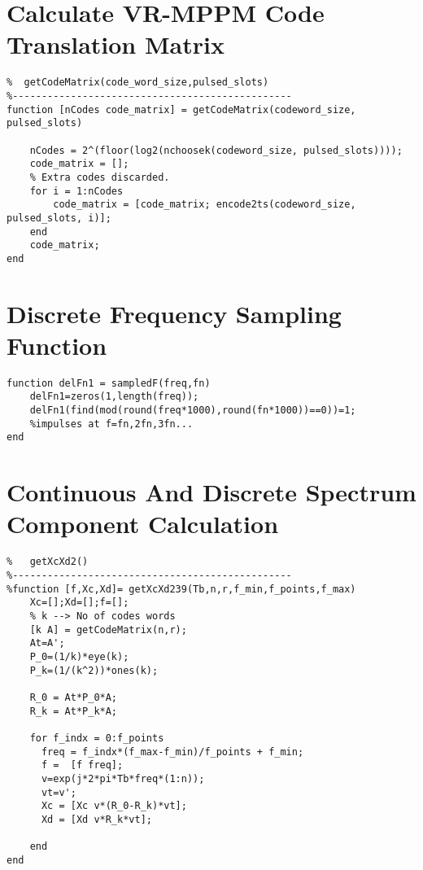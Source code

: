 \newpage
\section{Calculate VR-MPPM Code Translation Matrix}
\begin{lstlisting}[style=Matlab-editor,basicstyle=\footnotesize]
%------------------------------------------------
%  getCodeMatrix(code_word_size,pulsed_slots)
%------------------------------------------------
function [nCodes code_matrix] = getCodeMatrix(codeword_size, pulsed_slots)

    nCodes = 2^(floor(log2(nchoosek(codeword_size, pulsed_slots))));
    code_matrix = [];
    % Extra codes discarded.
    for i = 1:nCodes
        code_matrix = [code_matrix; encode2ts(codeword_size, pulsed_slots, i)];
    end
    code_matrix;
end
\end{lstlisting}

\newpage
\section{Discrete Frequency Sampling Function}
\begin{lstlisting}[style=Matlab-editor,basicstyle=\footnotesize]
function delFn1 = sampledF(freq,fn)
    delFn1=zeros(1,length(freq));
    delFn1(find(mod(round(freq*1000),round(fn*1000))==0))=1;
    %impulses at f=fn,2fn,3fn... 
end
\end{lstlisting}

\newpage
\section{Continuous And Discrete Spectrum Component Calculation}
\begin{lstlisting}[style=Matlab-editor,basicstyle=\footnotesize]
%------------------------------------------------
%   getXcXd2()
%------------------------------------------------
%function [f,Xc,Xd]= getXcXd239(Tb,n,r,f_min,f_points,f_max)
    Xc=[];Xd=[];f=[];    
    % k --> No of codes words
    [k A] = getCodeMatrix(n,r);
    At=A';
    P_0=(1/k)*eye(k);
    P_k=(1/(k^2))*ones(k);
    
    R_0 = At*P_0*A;
    R_k = At*P_k*A;
    
    for f_indx = 0:f_points
      freq = f_indx*(f_max-f_min)/f_points + f_min;
      f =  [f freq];
      v=exp(j*2*pi*Tb*freq*(1:n));
      vt=v';
      Xc = [Xc v*(R_0-R_k)*vt];
      Xd = [Xd v*R_k*vt];
      
    end
end
\end{lstlisting}